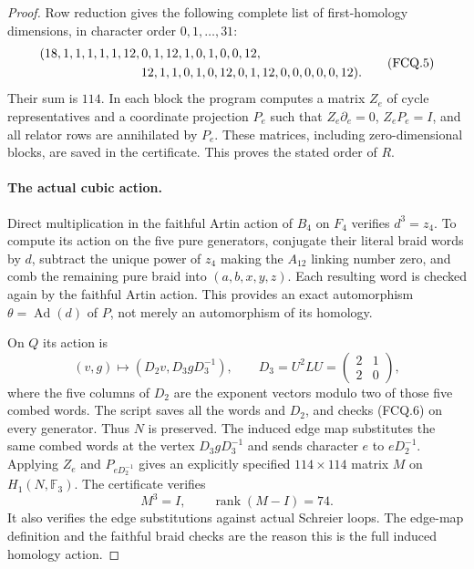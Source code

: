 \begin{proof}
Row reduction gives the following complete list of first-homology
dimensions, in character order $0,1,\ldots,31$:
\[
\begin{split}
 &(18,1,1,1,1,1,12,0,1,12,1,0,1,0,0,12,\\
 &\hspace{28mm}12,1,1,0,1,0,12,0,1,12,0,0,0,0,0,12).
\end{split}                                                     \tag{FCQ.5}
\]
Their sum is $114$.  In each block the program computes a matrix
$Z_e$ of cycle representatives and a coordinate projection $P_e$
such that $Z_e\partial_e=0$, $Z_eP_e=I$, and all relator rows are
annihilated by $P_e$.  These matrices, including zero-dimensional
blocks, are saved in the certificate.  This proves the stated
order of $R$.

\paragraph{The actual cubic action.}
Direct multiplication in the faithful Artin action of $B_4$ on
$F_4$ verifies $d^3=z_4$.  To compute its action on the five pure
generators, conjugate their literal braid words by $d$, subtract the
unique power of $z_4$ making the $A_{12}$ linking number zero, and
comb the remaining pure braid into $(a,b,x,y,z)$.  Each resulting
word is checked again by the faithful Artin action.  This provides
an exact automorphism $\theta=\operatorname{Ad}(d)$ of $P$, not
merely an automorphism of its homology.

On $Q$ its action is
\[
 (v,g)\longmapsto (D_2v,D_3gD_3^{-1}),\qquad
 D_3=U^2LU=\begin{pmatrix}2&1\\2&0\end{pmatrix},  \tag{FCQ.6}
\]
where the five columns of $D_2$ are the exponent vectors modulo two
of those five combed words.  The script saves all the words and
$D_2$, and checks \textup{(FCQ.6)} on every generator.  Thus $N$ is
preserved.  The induced edge map substitutes the same combed words
at the vertex $D_3gD_3^{-1}$ and sends character $e$ to
$eD_2^{-1}$.  Applying $Z_e$ and $P_{eD_2^{-1}}$ gives an explicitly
specified $114\times114$ matrix $M$ on $H_1(N,\mathbb F_3)$.
The certificate verifies
\[
 M^3=I,
 \qquad \operatorname{rank}(M-I)=74.              \tag{FCQ.7}
\]
It also verifies the edge substitutions against actual Schreier
loops.  The edge-map definition and the faithful braid checks are
the reason this is the full induced homology action.


\end{proof}
